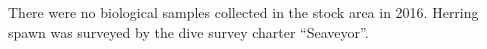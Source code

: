 There were no biological samples collected in the \regionName{} \regionType{} stock area in 2016. 
Herring spawn was surveyed by the dive survey charter ``Seaveyor''.
